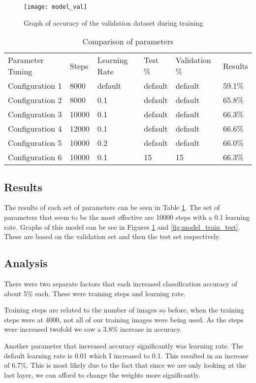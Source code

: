 \begin{figure}
    \texttt{[image: model\_val]}
     \caption{Graph of accuracy of the validation dataset during training}
     \label{fig:model_train_val}
\end{figure}

\begin{table}[]
	\centering
	\caption{Comparison of parameters}
	\label{parameter_tuning_table}
	\begin{tabular}{llllll}
		Parameter Tuning & Steps & Learning Rate & Test \% & Validation \% &
		Results \\
		Configuration 1  & 8000  & default       & default & default       &
		59.1\%  \\
		Configuration 2  & 8000  & 0.1           & default & default       &
		65.8\%  \\
		Configuration 3  & 10000 & 0.1           & default & default       &
		66.3\%  \\
		Configuration 4  & 12000 & 0.1           & default & default       &
		66.6\%  \\
		Configuration 5  & 10000 & 0.2           & default & default       &
		66.0\%  \\
		Configuration 6  & 10000 & 0.1           & 15      & 15            &
		66.3\% 
	\end{tabular}
\end{table}

\subsection*{Results}
The results of each set of parameters can be seen in Table
\ref{parameter_tuning_table}. The set of parameters that seem to be the most
effective are 10000 steps with a 0.1 learning rate. Graphs of this model can be
see in Figures \ref{fig:model_train_val} and \ref{fig:model_train_test}. These
are based on the validation set and then the test set respectively.
\subsection*{Analysis}
There were two separate factors that each increased classification accuracy of
about 5\% each. These were training steps and learning rate.

Training steps are related to the number of images so before, when the training
steps were at 4000, not all of our training images were being used. As the steps were increased
twofold we saw a 3.8\% increase in accuracy.

Another parameter that increased accuracy significantly was learning rate. The
default learning rate is 0.01 which I increased to 0.1. This resulted in an
increase of 6.7\%. This is most likely due to the fact that since we are only
looking at the last layer, we can afford to change the weights more
significantly.
